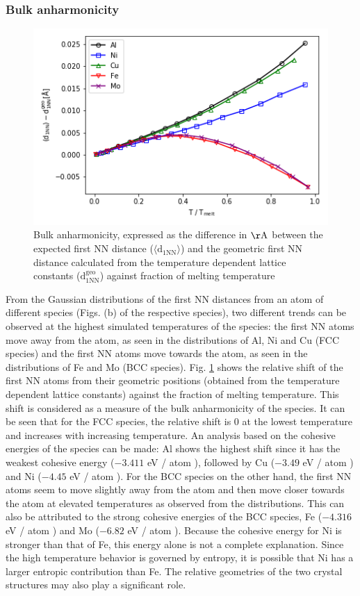\documentclass{article}
\begin{document}
\subsubsection{Bulk anharmonicity}\label{bulk_anharm}

\begin{figure}[htp]
\centering
\includegraphics[scale=0.65]{bulk_anharm_all}
\caption{Bulk anharmonicity, expressed as the difference in $\mathrm{\AA}$ between the expected first NN distance ($\langle \mathrm{d_{1NN}} \rangle$) and the geometric first NN distance calculated from the temperature dependent lattice constants ($\mathrm{d_{1NN}^{geo}}$) against fraction of melting temperature}
\label{fig:20}
\end{figure}

From the Gaussian distributions of the first NN distances from an atom of different species (Figs. (b) of the respective species), two different trends can be observed at the highest simulated temperatures of the species: the first NN atoms move away from the atom, as seen in the distributions of Al, Ni and Cu (FCC species) and the first NN atoms move towards the atom, as seen in the distributions of Fe and Mo (BCC species). Fig. \ref{fig:20} shows the relative shift of the first NN atoms from their geometric positions (obtained from the temperature dependent lattice constants) against the fraction of melting temperature. This shift is considered as a measure of the bulk anharmonicity of the species. It can be seen that for the FCC species, the relative shift is 0 at the lowest temperature and increases with increasing temperature. An analysis based on the cohesive energies of the species can be made: Al shows the highest shift since it has the weakest cohesive energy ($-3.411$ eV / atom \cite{Mendelev2009a}), followed by Cu ($-3.49$ eV / atom \cite{Mendelev2008}) and Ni ($-4.45$ eV / atom \cite{Mishin2004}). For the BCC species on the other hand, the first NN atoms seem to move slightly away from the atom and then move closer towards the atom at elevated temperatures as observed from the distributions. This can also be attributed to the strong cohesive energies of the BCC species, Fe ($-4.316$ eV / atom  \cite{Ackland1997}) and Mo ($-6.82$ eV / atom \cite{Zhou2004}). Because the cohesive energy for Ni is stronger than that of Fe, this energy alone is not a complete explanation. Since the high temperature behavior is governed by entropy, it is possible that Ni has a larger entropic contribution than Fe. The relative geometries of the two crystal structures may also play a significant role.
\end{document}
